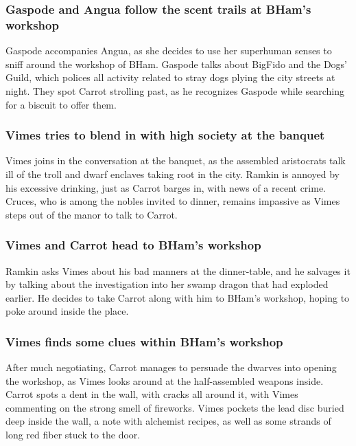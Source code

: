 \subsubsection{\Gls{Gaspode} and \Gls{Angua} follow the scent trails at \Gls{BHam}'s workshop}
\Gls{Gaspode} accompanies \Gls{Angua}, as she decides to use her superhuman senses to sniff around
the workshop of \Gls{BHam}. \Gls{Gaspode} talks about \Gls{BigFido} and the Dogs' Guild, which
polices all activity related to stray dogs plying the city streets at night. They spot \Gls{Carrot}
strolling past, as he recognizes \Gls{Gaspode} while searching for a biscuit to offer them.

\subsubsection{\Gls{Vimes} tries to blend in with high society at the banquet}
\Gls{Vimes} joins in the conversation at the banquet, as the assembled aristocrats talk ill of the
troll and dwarf enclaves taking root in the city. \Gls{Ramkin} is annoyed by his excessive drinking,
just as \Gls{Carrot} barges in, with news of a recent crime. \Gls{Cruces}, who is among the nobles
invited to dinner, remains impassive as \Gls{Vimes} steps out of the manor to talk to \Gls{Carrot}.

\subsubsection{\Gls{Vimes} and \Gls{Carrot} head to \Gls{BHam}'s workshop}
\Gls{Ramkin} asks \Gls{Vimes} about his bad manners at the dinner-table, and he salvages it by
talking about the investigation into her swamp dragon that had exploded earlier. He decides to take
\Gls{Carrot} along with him to \Gls{BHam}'s workshop, hoping to poke around inside the place.

\subsubsection{\Gls{Vimes} finds some clues within \Gls{BHam}'s workshop}
After much negotiating, \Gls{Carrot} manages to persuade the dwarves into opening the workshop,
as \Gls{Vimes} looks around at the half-assembled weapons inside. \Gls{Carrot} spots a dent in the
wall, with cracks all around it, with \Gls{Vimes} commenting on the strong smell of fireworks.
\Gls{Vimes} pockets the lead disc buried deep inside the wall, a note with alchemist recipes, as
well as some strands of long red fiber stuck to the door.

